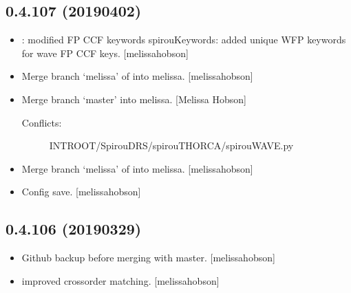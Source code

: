 \documentclass[a4paper,10pt,english]{report}
\begin{document}
\subsection{0.4.107 (2019\sphinxhyphen{}04\sphinxhyphen{}02)}
\label{\detokenize{misc/changelog:id173}}\begin{itemize}
\item {} 
: modified FP CCF keywords spirouKeywords: added unique
WFP keywords for wave FP CCF keys. {[}melissa\sphinxhyphen{}hobson{]}

\item {} 
Merge branch ‘melissa’ of  into
melissa. {[}melissa\sphinxhyphen{}hobson{]}

\item {} 
Merge branch ‘master’ into melissa. {[}Melissa Hobson{]}
\begin{description}
\item[{Conflicts:}] \leavevmode
INTROOT/SpirouDRS/spirouTHORCA/spirouWAVE.py

\end{description}

\item {} 
Merge branch ‘melissa’ of  into
melissa. {[}melissa\sphinxhyphen{}hobson{]}

\item {} 
Config save. {[}melissa\sphinxhyphen{}hobson{]}

\end{itemize}


\subsection{0.4.106 (2019\sphinxhyphen{}03\sphinxhyphen{}29)}
\label{\detokenize{misc/changelog:id174}}\begin{itemize}
\item {} 
Github backup before merging with master. {[}melissa\sphinxhyphen{}hobson{]}

\item {} 
 improved cross\sphinxhyphen{}order matching. {[}melissa\sphinxhyphen{}hobson{]}

\end{itemize}
\end{document}
